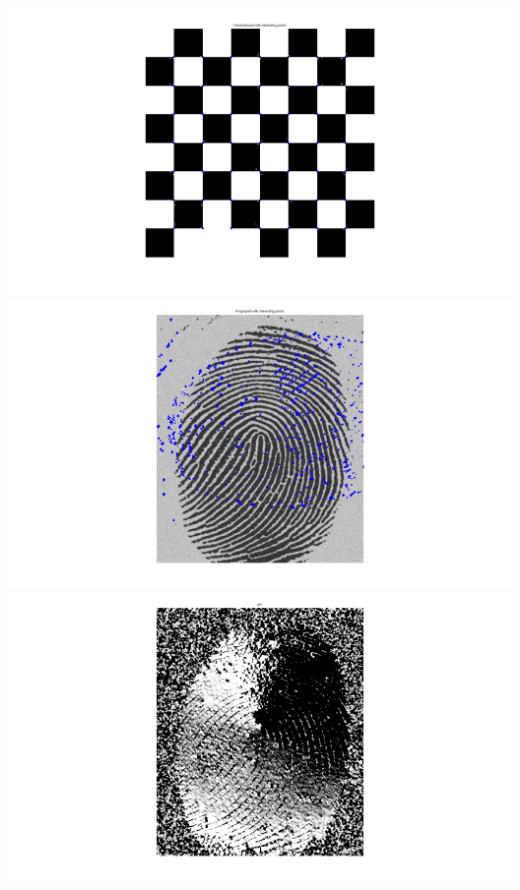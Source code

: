 \documentclass{article}
\begin{document}
\includegraphics [width=9in]{2a.png}
\includegraphics [width=9in]{2b_1.png}
\includegraphics [width=9in]{2b_2.png}
\end{document}
